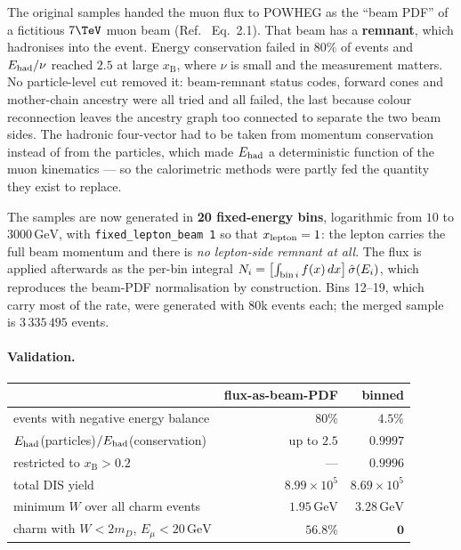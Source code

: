 \documentclass[11pt,a4paper]{article}
\newcommand{\xB}{x_{\mathrm{B}}}
\newcommand{\GeV}{\,\mathrm{GeV}}
\begin{document}
The original samples handed the muon flux to POWHEG as the ``beam PDF'' of a
fictitious $7\TeV$ muon beam (Ref.~\cite{francener} Eq.~2.1). That beam has a
\textbf{remnant}, which hadronises into the event. Energy conservation failed in
$80\%$ of events and $E_{\rm had}/\nu$ reached $2.5$ at large $\xB$, where $\nu$
is small and the measurement matters. No particle-level cut removed it:
beam-remnant status codes, forward cones and mother-chain ancestry were all
tried and all failed, the last because colour reconnection leaves the ancestry
graph too connected to separate the two beam sides. The hadronic four-vector had
to be taken from momentum conservation instead of from the particles, which made
$E_{\rm had}$ a deterministic function of the muon kinematics --- so the
calorimetric methods were partly fed the quantity they exist to replace.

The samples are now generated in \textbf{20 fixed-energy bins}, logarithmic from
$10$ to $3000\GeV$, with \texttt{fixed\_lepton\_beam 1} so that $x_{\rm lepton}=1$:
the lepton carries the full beam momentum and there is \emph{no lepton-side
remnant at all}. The flux is applied afterwards as the per-bin integral
$N_i = \left[\int_{{\rm bin}\,i} f(x)\,dx\right]\hat\sigma(E_i)$, which reproduces
the beam-PDF normalisation by construction. Bins 12--19, which carry most of the
rate, were generated with $80$k events each; the merged sample is
$3\,335\,495$ events.

\paragraph{Validation.}
\begin{center}\small
\begin{tabular}{lrr}
\toprule
 & flux-as-beam-PDF & binned \\
\midrule
events with negative energy balance & $80\%$ & $\mathbf{4.5\%}$ \\
$E_{\rm had}$(particles)$/E_{\rm had}$(conservation) & up to $2.5$ & $\mathbf{0.9997}$ \\
\quad restricted to $\xB>0.2$ & --- & $\mathbf{0.9996}$ \\
total DIS yield & $8.99\times10^{5}$ & $8.69\times10^{5}$ \\
minimum $W$ over all charm events & $1.95\GeV$ & $\mathbf{3.28\GeV}$ \\
charm with $W<2m_D$, $E_\mu<20\GeV$ & $56.8\%$ & $\mathbf{0}$ \\
\bottomrule
\end{tabular}
\end{center}
\end{document}
